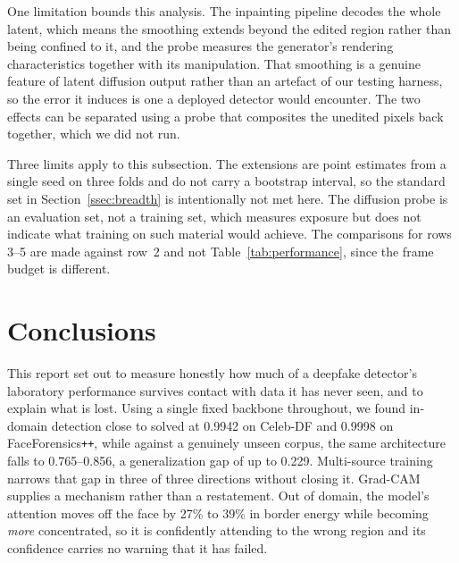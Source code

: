 \documentclass[journal,onecolumn]{IEEEtran}
\newcommand{\celebdf}{Celeb-DF}
\begin{document}
One limitation bounds this analysis. The inpainting pipeline decodes the whole
latent, which means the smoothing extends beyond the edited region rather
than being confined to it, and the probe measures the generator's rendering
characteristics together with its manipulation. That smoothing is a genuine
feature of latent diffusion output rather than an artefact of our testing
harness, so the error it induces is one a deployed detector would
encounter. The two effects can be separated using a probe that composites the
unedited pixels back together, which we did not run.

Three limits apply to this subsection. The extensions are point estimates from a
single seed on three folds and do not carry a bootstrap interval, so the
standard set in Section~\ref{ssec:breadth} is intentionally not met here. The
diffusion probe is an evaluation set, not a training set, which measures
exposure but does not indicate what training on such material would achieve. The
comparisons for rows 3--5 are made against row~2 and not
Table~\ref{tab:performance}, since the frame budget is different.

\section{Conclusions}
\label{sec:conclusion}

This report set out to measure honestly how much of a deepfake detector's
laboratory performance survives contact with data it has never seen, and to
explain what is lost. Using a single fixed backbone throughout, we found
in-domain detection close to solved at 0.9942 on \celebdf{} and 0.9998 on
FaceForensics\texttt{++}, while against a genuinely unseen corpus, the same
architecture falls to 0.765--0.856, a generalization gap of up to 0.229.
Multi-source training narrows that gap in three of three directions without
closing it. Grad-CAM supplies a mechanism rather than a restatement. Out of
domain, the model's attention moves off the face by 27\% to 39\% in border energy
while becoming \emph{more} concentrated, so it is confidently attending to the
wrong region and its confidence carries no warning that it has failed.
\end{document}
